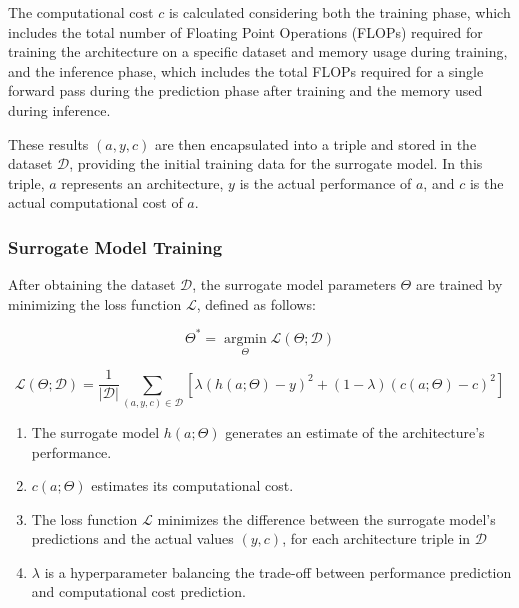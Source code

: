 \documentclass{article}
\begin{document}
The computational cost $c$ is calculated considering both the training phase, which includes the total number of Floating Point Operations (FLOPs) required for training the architecture on a specific dataset and memory usage during training, and the inference phase, which includes the total FLOPs required for a single forward pass during the prediction phase after training and the memory used during inference.

These results $(a, y, c)$ are then encapsulated into a triple and stored in the dataset $\mathcal{D}$, providing the initial training data for the surrogate model. In this triple, $a$ represents an architecture, $y$ is the actual performance of $a$, and $c$ is the actual computational cost of $a$.

\subsubsection{Surrogate Model Training}

After obtaining the dataset $\mathcal{D}$, the surrogate model parameters $\Theta$ are trained by minimizing the loss function $\mathcal{L}$, defined as follows:

\begin{equation}
\Theta^* = \underset{\Theta}{\operatorname{argmin}} \mathcal{L}(\Theta;\mathcal{D})
\end{equation}

\begin{equation}
\mathcal{L}(\Theta;\mathcal{D}) = \frac{1}{|\mathcal{D}|} \sum_{(a,y,c) \in \mathcal{D}} \left[\lambda(h(a;\Theta)-y)^2 + (1-\lambda)(c(a;\Theta)-c)^2\right]
\end{equation}

\begin{enumerate}
    \item The surrogate model $h(a;\Theta)$ generates an estimate of the architecture's performance.
    \item $c(a;\Theta)$ estimates its computational cost.
    \item The loss function $\mathcal{L}$ minimizes the difference between the surrogate model's predictions and the actual values $(y, c)$, for each architecture triple in $\mathcal{D}$
    \item $\lambda$ is a hyperparameter balancing the trade-off between performance prediction and computational cost prediction.
\end{enumerate}
\end{document}

